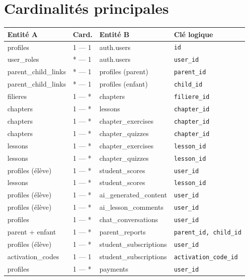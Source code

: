 \section{Cardinalités principales}
\begin{longtable}{p{4.5cm}p{1.6cm}p{4.5cm}p{2.8cm}}
\toprule
\textbf{Entité A} & \textbf{Card.} & \textbf{Entité B} & \textbf{Clé logique} \\
\midrule \endhead
profiles & 1 --- 1 & auth.users & \texttt{id} \\
user\_roles & * --- 1 & auth.users & \texttt{user\_id} \\
parent\_child\_links & * --- 1 & profiles (parent) & \texttt{parent\_id} \\
parent\_child\_links & * --- 1 & profiles (enfant) & \texttt{child\_id} \\
filieres & 1 --- * & chapters & \texttt{filiere\_id} \\
chapters & 1 --- * & lessons & \texttt{chapter\_id} \\
chapters & 1 --- * & chapter\_exercises & \texttt{chapter\_id} \\
chapters & 1 --- * & chapter\_quizzes & \texttt{chapter\_id} \\
lessons & 1 --- * & chapter\_exercises & \texttt{lesson\_id} \\
lessons & 1 --- * & chapter\_quizzes & \texttt{lesson\_id} \\
profiles (élève) & 1 --- * & student\_scores & \texttt{user\_id} \\
lessons & 1 --- * & student\_scores & \texttt{lesson\_id} \\
profiles (élève) & 1 --- * & ai\_generated\_content & \texttt{user\_id} \\
profiles (élève) & 1 --- * & ai\_lesson\_comments & \texttt{user\_id} \\
profiles & 1 --- * & chat\_conversations & \texttt{user\_id} \\
parent + enfant & 1 --- * & parent\_reports & \texttt{parent\_id, child\_id} \\
profiles (élève) & 1 --- * & student\_subscriptions & \texttt{user\_id} \\
activation\_codes & 1 --- 1 & student\_subscriptions & \texttt{activation\_code\_id} \\
profiles & 1 --- * & payments & \texttt{user\_id} \\
\bottomrule
\end{longtable}


